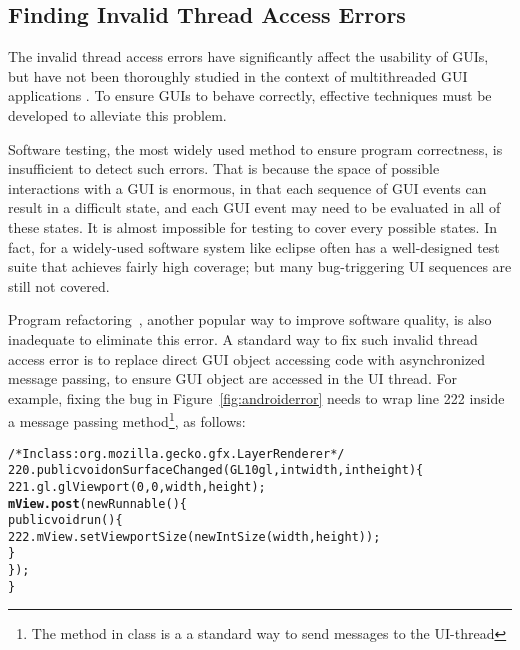 


\subsection{Finding Invalid Thread Access Errors}

The invalid thread access errors have significantly affect the
usability of GUIs, but have not been thoroughly studied in
the context of multithreaded GUI applications . To ensure GUIs
to behave correctly, effective
techniques must be developed to alleviate this problem.


Software testing, the most widely used method to ensure program correctness,
is insufficient to detect such errors. That is because the space of possible interactions
with a GUI is enormous, in that each sequence of GUI events can result in
a difficult state, and each GUI event may need to be evaluated in all of
these states. It is almost impossible for testing to cover every possible
states. In fact, for a widely-used software system like eclipse
often has a well-designed test suite that achieves fairly high coverage; but many
 bug-triggering UI sequences are still not covered.

Program refactoring~\cite{Mens:2004}, another popular way to improve software quality,
is also inadequate to eliminate this error.  A standard way to fix such
invalid thread access error is to replace direct GUI object accessing code 
with asynchronized message passing, to ensure GUI object are accessed in
the UI thread. For example, fixing the bug in Figure~\ref{fig:androiderror}
needs to wrap line 222 inside a  message passing method\footnote{The
 method in class  is a
a standard way to send messages to the UI-thread}, as follows:


\begin{CodeOut}
\begin{alltt}
     /* In class: org.mozilla.gecko.gfx.LayerRenderer */
220. public void onSurfaceChanged(GL10 gl, int width, int height) \{
221.     gl.glViewport(0, 0, width, height);
         \textbf{mView.post}(new Runnable() \{
             public void run() \{
222.             mView.setViewportSize(new IntSize(width, height));
             \}
         \});
     \}
\end{alltt}
\end{CodeOut}

